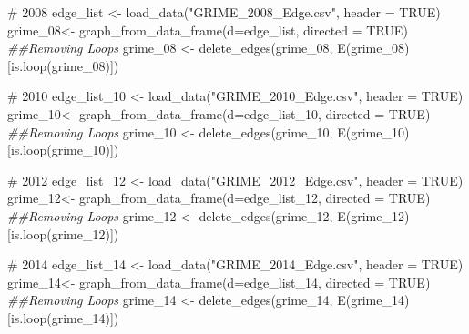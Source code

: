 \documentclass[
  letterpaper,
  DIV=11,
  numbers=noendperiod]{scrreprt}
\newenvironment{Shaded}{\begin{snugshade}}{\end{snugshade}}
\newcommand{\AttributeTok}[1]{\textcolor[rgb]{0.40,0.45,0.13}{#1}}
\newcommand{\CommentTok}[1]{\textcolor[rgb]{0.37,0.37,0.37}{#1}}
\newcommand{\ConstantTok}[1]{\textcolor[rgb]{0.56,0.35,0.01}{#1}}
\newcommand{\DocumentationTok}[1]{\textcolor[rgb]{0.37,0.37,0.37}{\textit{#1}}}
\newcommand{\FunctionTok}[1]{\textcolor[rgb]{0.28,0.35,0.67}{#1}}
\newcommand{\NormalTok}[1]{\textcolor[rgb]{0.00,0.23,0.31}{#1}}
\newcommand{\OtherTok}[1]{\textcolor[rgb]{0.00,0.23,0.31}{#1}}
\newcommand{\StringTok}[1]{\textcolor[rgb]{0.13,0.47,0.30}{#1}}
\begin{document}
\begin{Shaded}
\begin{Highlighting}[]
\CommentTok{\# 2008}
\NormalTok{edge\_list }\OtherTok{\textless{}{-}} \FunctionTok{load\_data}\NormalTok{(}\StringTok{"GRIME\_2008\_Edge.csv"}\NormalTok{, }\AttributeTok{header =} \ConstantTok{TRUE}\NormalTok{)}
\NormalTok{grime\_08}\OtherTok{\textless{}{-}} \FunctionTok{graph\_from\_data\_frame}\NormalTok{(}\AttributeTok{d=}\NormalTok{edge\_list, }\AttributeTok{directed =} \ConstantTok{TRUE}\NormalTok{)}
\DocumentationTok{\#\#Removing Loops}
\NormalTok{grime\_08 }\OtherTok{\textless{}{-}} \FunctionTok{delete\_edges}\NormalTok{(grime\_08, }\FunctionTok{E}\NormalTok{(grime\_08)[}\FunctionTok{is.loop}\NormalTok{(grime\_08)])}


\CommentTok{\# 2010}
\NormalTok{edge\_list\_10 }\OtherTok{\textless{}{-}} \FunctionTok{load\_data}\NormalTok{(}\StringTok{"GRIME\_2010\_Edge.csv"}\NormalTok{, }\AttributeTok{header =} \ConstantTok{TRUE}\NormalTok{)}
\NormalTok{grime\_10}\OtherTok{\textless{}{-}} \FunctionTok{graph\_from\_data\_frame}\NormalTok{(}\AttributeTok{d=}\NormalTok{edge\_list\_10, }\AttributeTok{directed =} \ConstantTok{TRUE}\NormalTok{)}
\DocumentationTok{\#\#Removing Loops}
\NormalTok{grime\_10 }\OtherTok{\textless{}{-}} \FunctionTok{delete\_edges}\NormalTok{(grime\_10, }\FunctionTok{E}\NormalTok{(grime\_10)[}\FunctionTok{is.loop}\NormalTok{(grime\_10)])}

\CommentTok{\# 2012}
\NormalTok{edge\_list\_12 }\OtherTok{\textless{}{-}} \FunctionTok{load\_data}\NormalTok{(}\StringTok{"GRIME\_2012\_Edge.csv"}\NormalTok{, }\AttributeTok{header =} \ConstantTok{TRUE}\NormalTok{)}
\NormalTok{grime\_12}\OtherTok{\textless{}{-}} \FunctionTok{graph\_from\_data\_frame}\NormalTok{(}\AttributeTok{d=}\NormalTok{edge\_list\_12, }\AttributeTok{directed =} \ConstantTok{TRUE}\NormalTok{)}
\DocumentationTok{\#\#Removing Loops}
\NormalTok{grime\_12 }\OtherTok{\textless{}{-}} \FunctionTok{delete\_edges}\NormalTok{(grime\_12, }\FunctionTok{E}\NormalTok{(grime\_12)[}\FunctionTok{is.loop}\NormalTok{(grime\_12)])}

\CommentTok{\# 2014}
\NormalTok{edge\_list\_14 }\OtherTok{\textless{}{-}} \FunctionTok{load\_data}\NormalTok{(}\StringTok{"GRIME\_2014\_Edge.csv"}\NormalTok{, }\AttributeTok{header =} \ConstantTok{TRUE}\NormalTok{)}
\NormalTok{grime\_14}\OtherTok{\textless{}{-}} \FunctionTok{graph\_from\_data\_frame}\NormalTok{(}\AttributeTok{d=}\NormalTok{edge\_list\_14, }\AttributeTok{directed =} \ConstantTok{TRUE}\NormalTok{)}
\DocumentationTok{\#\#Removing Loops}
\NormalTok{grime\_14 }\OtherTok{\textless{}{-}} \FunctionTok{delete\_edges}\NormalTok{(grime\_14, }\FunctionTok{E}\NormalTok{(grime\_14)[}\FunctionTok{is.loop}\NormalTok{(grime\_14)])}
\end{Highlighting}
\end{Shaded}
\end{document}

